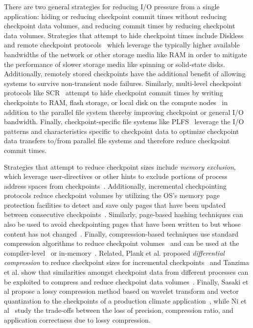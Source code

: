 \documentclass[two]{article}
\begin{document}
There are two general strategies for reducing I/O pressure from a single application:
hiding or reducing checkpoint commit times without reducing checkpoint data volumes,
and reducing commit times by reducing checkpoint data volumes.  Strategies that
attempt to hide checkpoint times include Diskless~\cite{Plank98Diskless} and remote
checkpoint protocols~\cite{Cornwell11RemoteBLCR} which leverage the typically higher
available bandwidths of the network or other storage media like RAM in order to
mitigate the performance of slower storage media like spinning or solid-state
disks. Additionally, remotely stored checkpoints have the additional benefit of
allowing systems to survive non-transient node failures. Similarly, multi-level
checkpoint protocols like SCR~\cite{Moody10SCR,Vaidya95TwoLevel} attempt to hide
checkpoint commit times by writing checkpoints to RAM, flash storage, or local disk
on the compute nodes~\cite{Kougkas2017} in addition to the parallel file system
thereby improving checkpoint or general I/O bandwidth.  Finally, checkpoint-specific
file systems like PLFS~\cite{Bent09PLFS} leverage the I/O patterns and
characteristics specific to checkpoint data to optimize checkpoint data transfers
to/from parallel file systems and therefore reduce checkpoint commit times.

Strategies that attempt to reduce checkpoint sizes include \emph{memory
exclusion}, which leverage user-directives or other hints to exclude portions of
process address spaces from checkpoints~\cite{Plank99MemoryExclusion}.
Additionally, incremental checkpointing protocols reduce checkpoint volumes by
utilizing the OS's memory page protection facilities to detect and save only
pages that have been updated between consecutive
checkpoints~\cite{Bronevetsky09Compiler,
Chen97CLIP,Elnozahy92ConsistentCheckpointing,Li94ConcurrentCheckpointing,
Plank94Libckpt,Paun10IncrementalWeibull,Kiswany08stdchk}.  Similarly,
page-based hashing techniques can also be used to avoid checkpointing pages
that have been written to but whose content has not
changed~\cite{Ferreira11Libhashckpt}.  Finally, compression-based techniques
use standard compression algorithms to reduce checkpoint
volumes~\cite{Ibtesham12Compression} and can be used at the
compiler-level~\cite{Li90CATCH} or in-memory~\cite{Plank94ICKP}.  Related,
Plank et al. proposed \textit{differential compression} to reduce checkpoint
sizes for incremental checkpoints~\cite{Plank95CompressedDiff} and Tanzima et
al.  show that similarities amongst checkpoint data from different processes
can be exploited to compress and reduce checkpoint data
volumes~\cite{tanzima12mcrengine}.  Finally, Sasaki et al propose a lossy
compression method based on wavelet transform and vector quantization to the
checkpoints of a production climate application~\cite{sasaki2015}, while Ni et
al~\cite{Ni2014} study the trade-offs between the loss of precision, compression
ratio, and application correctness due to lossy compression.
\end{document}
